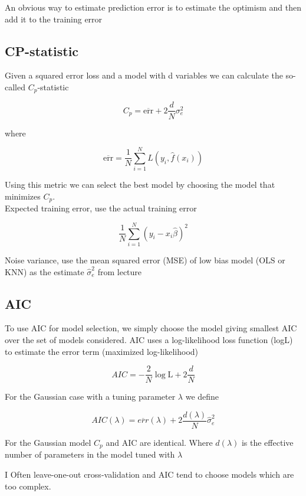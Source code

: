 An obvious way to estimate prediction error is to estimate the optimism
and then add it to the training error

\subsection{CP-statistic}

Given a squared error loss and a model with d variables we can
calculate the so-called $C_p$-statistic

\[
    C_p = \overline{\text{err}} + 2 \frac{d}{N} \sigma^2_e
\]

where

\[
    \overline{\text{err}} = \frac{1}{N} \sum_{i=1}^{N} L(y_i, \hat{f}(x_i))
\]

Using this metric we can select the best model by choosing the model
that minimizes $C_p$.\\

Expected training error, use the actual training error

\[
    \frac{1}{N} \sum_{i=1}^{N} (y_i - x_i \hat{\beta})^2
\]

Noise variance, use the mean squared error (MSE) of low bias model (OLS or KNN) as the estimate $\hat{\sigma}^2_e$ from lecture \cite[p.~39]{lecture2}



\subsection{AIC}

To use AIC for model selection, we simply choose the model giving smallest AIC over the set of models considered. \cite[p.~231]{friedman2016elements}
AIC uses a log-likelihood loss function (logL) to estimate the error term (maximized log-likelihood)\cite[p.~40]{lecture2}

\[
    AIC = - \frac{2}{N} \log \text{L} + 2 \frac{d}{N}
\]

For the Gaussian case with a tuning parameter $\lambda$ we define

\[
    AIC(\lambda) = \overline{err}(\lambda) + 2 \frac{d(\lambda)}{N} \hat{\sigma}^2_e
\]

For the Gaussian model $C_p$ and AIC are identical. Where $d(\lambda)$ is the effective number of parameters in the model tuned with $\lambda$

I Often leave-one-out cross-validation and AIC tend to choose
models which are too complex. \cite[p.~45]{lecture2}

